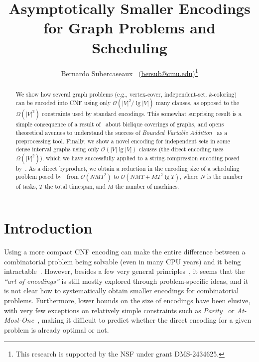 \documentclass[11pt]{article}
\title{{\bfseries\huge{Asymptotically Smaller Encodings\\ for Graph Problems and Scheduling}}} %
\author{Bernardo Subercaseaux~\orcidlink{0000-0001-2345-6789} (\url{bersub@cmu.edu})\thanks{This research is supported by the NSF under grant DMS-2434625.}}
\affil{Carnegie Mellon University, Pittsburgh PA}
\renewcommand{\O}{\mathcal{O}}
\begin{document}
\maketitle

\begin{abstract}
    We show how several graph problems (e.g., vertex-cover, independent-set, $k$-coloring) can be encoded into CNF using only $\O(|V|^2 / \lg |V|)$ many clauses, as opposed to the $\Omega(|V|^2)$ constraints used by standard encodings. This somewhat surprising result is a simple consequence of a result of~\citet{chungDecompositionGraphsComplete1983} about biclique coverings of graphs, and opens theoretical avenues to understand the success of \emph{Bounded Variable Addition}~\citep{mantheyAutomatedReencodingBoolean2012} as a preprocessing tool. Finally, we show a novel encoding for independent sets in some dense interval graphs using only $\O(|V| \lg |V|)$ clauses (the direct encoding uses $\Omega(|V|^2)$), 
    which we have successfully applied to a string-compression encoding posed by~\citet{bannai_et_al:LIPIcs.ESA.2022.12}. As a direct byproduct, we obtain a reduction in the encoding size of a scheduling problem posed by~\citet{mayankEfficientSATEncoding2020} from $\O(N\!MT^2)$ to $\O(N\!MT + M T^2 \lg T)$, where $N$ is the number of tasks, $T$ the total timespan, and $M$ the number of machines.
\end{abstract}


\section{Introduction}
Using a more compact CNF encoding can make the entire difference between a combinatorial problem being solvable (even in many CPU years) and it being intractable~\citep{subercaseauxPackingChromaticNumber2023d,heuleHappyEndingEmpty2024c,wesleyLowerBoundsBook2024,heuleSATApproachCliqueWidth2015,schidlerSATbasedDecisionTree2024,qian2025unfoldingboxeslocalconstraints}.
However, besides a few very general principles~\citep{DBLP:journals/jsat/Bjork11,Prestwich2021}, it seems that the \emph{``art of encodings''} is still mostly explored through problem-specific ideas, and it is not clear how to systematically obtain smaller encodings for combinatorial problems. Furthermore, lower bounds on the size of encodings have been elusive, with very few exceptions on relatively simple constraints such as \emph{Parity}~\citep{emdinCNFEncodingsParity2022} or \emph{At-Most-One}~\citep{kuceraLowerBoundCNF2019}, making it difficult to predict whether the direct encoding for a given problem is already optimal or not. 
\end{document}
